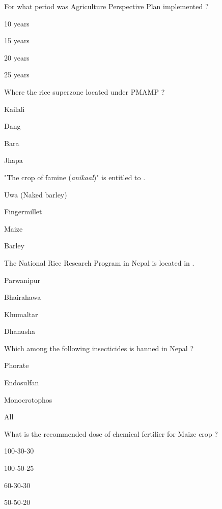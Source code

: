 \begin{questions}
\question For what period was Agriculture Perspective Plan implemented ?
\begin{items}
\item 10 years
\item 15 years
\item* 20 years
\item 25 years
\end{items}

\question Where the rice superzone located under PMAMP ?
\begin{items}
\item Kailali
\item Dang
\item Bara
\item* Jhapa
\end{items}

\question "The crop of famine (\textit{anikaal})" is entitled to \fillin[][3cm].
\begin{items}
\item* Uwa (Naked barley)
\item Fingermillet
\item Maize
\item Barley
\end{items}

\question The National Rice Research Program in Nepal is located in \fillin[][3cm].
\begin{items}
\item Parwanipur
\item Bhairahawa
\item Khumaltar
\item* Dhanusha
\end{items}

\question Which among the following insecticides is banned in Nepal ?
\begin{items}
\item Phorate
\item Endosulfan
\item Monocrotophos
\item* All
\end{items}

\question What is the recommended dose of chemical fertilier for Maize crop ?
\begin{items}
\item 100-30-30
\item 100-50-25
\item* 60-30-30
\item 50-50-20
\end{items}


\end{questions}
